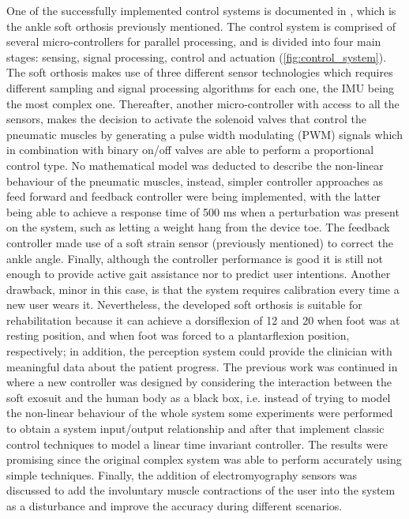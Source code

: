 One of the successfully implemented control systems is documented in \cite{park2011bio}, which is the ankle soft orthosis previously mentioned. The control system is comprised of several micro-controllers for parallel processing, and is divided into four main stages: sensing, signal processing, control and actuation (\autoref{fig:control_system}). The soft orthosis makes use of three different sensor technologies which requires different sampling and signal processing algorithms for each one, the IMU being the most complex one. Thereafter, another micro-controller with access to all the sensors, makes the decision to activate the solenoid valves that control the pneumatic muscles by generating a pulse width modulating (PWM) signals which in combination with binary on/off valves are able to perform a proportional control type. No mathematical model was deducted to describe the non-linear behaviour of the pneumatic muscles, instead, simpler controller approaches as feed forward and feedback controller were being implemented, with the latter being able to achieve a response time of 500 ms when a perturbation was present on the system, such as letting a weight hang from the device toe. The feedback controller made use of a soft strain sensor (previously mentioned) to correct the ankle angle. Finally, although the controller performance is good it is still not enough to provide active gait assistance nor to predict user intentions. Another drawback, minor in this case, is that the system requires calibration every time a new user wears it. Nevertheless, the developed soft orthosis is suitable for rehabilitation because it can achieve a dorsiflexion of 12\textdegree{} and 20\textdegree{} when foot was at resting position, and when foot was forced to a plantarflexion position, respectively; in addition, the perception system could provide the clinician with meaningful data about the patient progress. The previous work was continued in \cite{park2014design} where a new controller was designed by considering the interaction between the soft exosuit and the human body as a black box, i.e. instead of trying to model the non-linear behaviour of the whole system some experiments were performed to obtain a system input/output relationship and after that implement classic control techniques to model a linear time invariant controller. The results were promising since the original complex system was able to perform accurately using simple techniques. Finally, the addition of electromyography sensors was discussed to add the involuntary muscle contractions of the user into the system as a disturbance and improve the accuracy during different scenarios.

